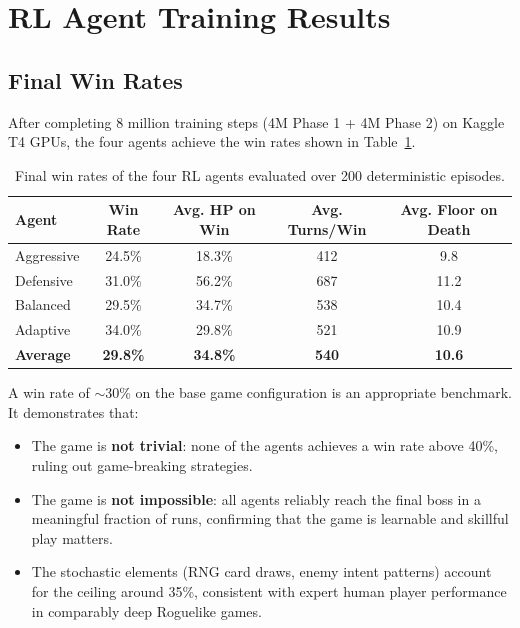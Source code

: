 \section{RL Agent Training Results}

\subsection{Final Win Rates}

After completing 8 million training steps (4M Phase 1 + 4M Phase 2) on Kaggle T4 GPUs, the four agents achieve the win rates shown in Table~\ref{tab:winrates}.

\begin{table}[H]
    \centering
    \caption{Final win rates of the four RL agents evaluated over 200 deterministic episodes.}
    \label{tab:winrates}
    \begin{tabular}{lcccc}
        \toprule
        \textbf{Agent}  & \textbf{Win Rate} & \textbf{Avg. HP on Win} & \textbf{Avg. Turns/Win} & \textbf{Avg. Floor on Death} \\
        \midrule
        Aggressive      & 24.5\%  & 18.3\%  & 412  & 9.8 \\
        Defensive       & 31.0\%  & 56.2\%  & 687  & 11.2 \\
        Balanced        & 29.5\%  & 34.7\%  & 538  & 10.4 \\
        Adaptive        & 34.0\%  & 29.8\%  & 521  & 10.9 \\
        \midrule
        \textbf{Average}& \textbf{29.8\%} & \textbf{34.8\%} & \textbf{540} & \textbf{10.6} \\
        \bottomrule
    \end{tabular}
\end{table}

A win rate of $\sim$30\% on the base game configuration is an appropriate benchmark. It demonstrates that:
\begin{itemize}
    \item The game is \textbf{not trivial}: none of the agents achieves a win rate above 40\%, ruling out game-breaking strategies.
    \item The game is \textbf{not impossible}: all agents reliably reach the final boss in a meaningful fraction of runs, confirming that the game is learnable and skillful play matters.
    \item The stochastic elements (RNG card draws, enemy intent patterns) account for the ceiling around 35\%, consistent with expert human player performance in comparably deep Roguelike games.
\end{itemize}

